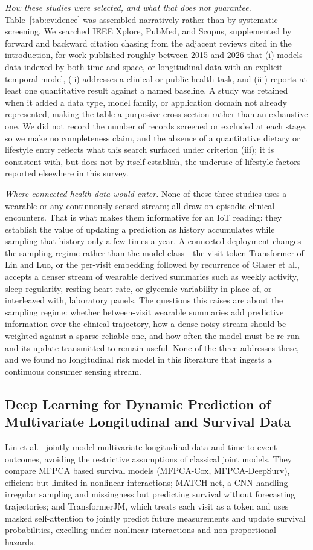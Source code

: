 \documentclass[journal]{IEEEtran}
\begin{document}
\emph{How these studies were selected, and what that does not guarantee.} Table~\ref{tab:evidence} was assembled narratively rather than by systematic screening. We searched IEEE Xplore, PubMed, and Scopus, supplemented by forward and backward citation chasing from the adjacent reviews cited in the introduction, for work published roughly between 2015 and 2026 that (i) models data indexed by both time and space, or longitudinal data with an explicit temporal model, (ii) addresses a clinical or public health task, and (iii) reports at least one quantitative result against a named baseline. A study was retained when it added a data type, model family, or application domain not already represented, making the table a purposive cross-section rather than an exhaustive one. We did not record the number of records screened or excluded at each stage, so we make no completeness claim, and the absence of a quantitative dietary or lifestyle entry reflects what this search surfaced under criterion (iii); it is consistent with, but does not by itself establish, the underuse of lifestyle factors reported elsewhere in this survey.

\emph{Where connected health data would enter.} None of these three studies uses a wearable or any continuously sensed stream; all draw on episodic clinical encounters. That is what makes them informative for an IoT reading: they establish the value of updating a prediction as history accumulates while sampling that history only a few times a year. A connected deployment changes the sampling regime rather than the model class---the visit token Transformer of Lin and Luo, or the per-visit embedding followed by recurrence of Glaser et al., accepts a denser stream of wearable derived summaries such as weekly activity, sleep regularity, resting heart rate, or glycemic variability in place of, or interleaved with, laboratory panels. The questions this raises are about the sampling regime: whether between-visit wearable summaries add predictive information over the clinical trajectory, how a dense noisy stream should be weighted against a sparse reliable one, and how often the model must be re-run and its update transmitted to remain useful. None of the three addresses these, and we found no longitudinal risk model in this literature that ingests a continuous consumer sensing stream.


\subsection{Deep Learning for Dynamic Prediction of Multivariate Longitudinal and Survival Data}
Lin et al.~\cite{lin2022deep} jointly model multivariate longitudinal data and time-to-event outcomes, avoiding the restrictive assumptions of classical joint models. They compare MFPCA based survival models (MFPCA-Cox, MFPCA-DeepSurv), efficient but limited in nonlinear interactions; MATCH-net, a CNN handling irregular sampling and missingness but predicting survival without forecasting trajectories; and TransformerJM, which treats each visit as a token and uses masked self-attention to jointly predict future measurements and update survival probabilities, excelling under nonlinear interactions and non-proportional hazards.
\end{document}
